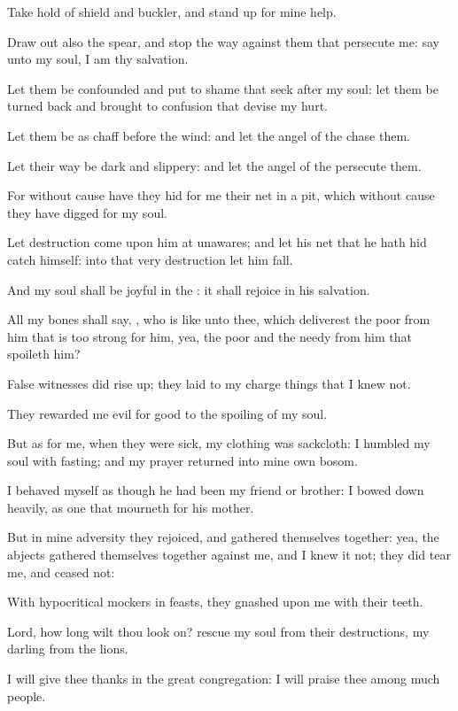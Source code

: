 \verse Take hold of shield and buckler, and stand up for mine help.

\verse Draw out also the spear, and stop the way against them that persecute me: say unto my soul, I am thy salvation.

\verse Let them be confounded and put to shame that seek after my soul: let them be turned back and brought to confusion that devise my hurt.

\verse Let them be as chaff before the wind: and let the angel of the \LORD chase them.

\verse Let their way be dark and slippery: and let the angel of the \LORD persecute them.

\verse For without cause have they hid for me their net in a pit, which without cause they have digged for my soul.

\verse Let destruction come upon him at unawares; and let his net that he hath hid catch himself: into that very destruction let him fall.

\verse And my soul shall be joyful in the \LORD: it shall rejoice in his salvation.

\verse All my bones shall say, \LORD, who is like unto thee, which deliverest the poor from him that is too strong for him, yea, the poor and the needy from him that spoileth him?

\verse False witnesses did rise up; they laid to my charge things that I knew not.

\verse They rewarded me evil for good to the spoiling of my soul.

\verse But as for me, when they were sick, my clothing was sackcloth: I humbled my soul with fasting; and my prayer returned into mine own bosom.

\verse I behaved myself as though he had been my friend or brother: I bowed down heavily, as one that mourneth for his mother.

\verse But in mine adversity they rejoiced, and gathered themselves together: yea, the abjects gathered themselves together against me, and I knew it not; they did tear me, and ceased not:

\verse With hypocritical mockers in feasts, they gnashed upon me with their teeth.

\verse Lord, how long wilt thou look on? rescue my soul from their destructions, my darling from the lions.

\verse I will give thee thanks in the great congregation: I will praise thee among much people.

